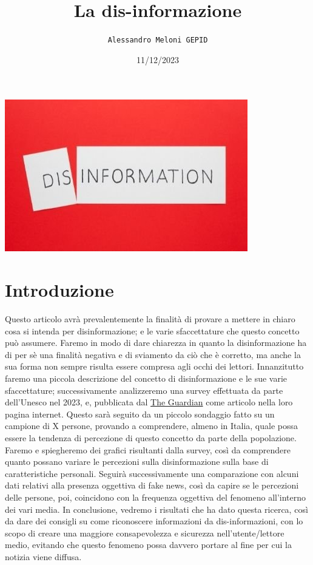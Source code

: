 \documentclass{article}
\title{\textbf{La dis-informazione}}
\author{\texttt{Alessandro Meloni GEPID}}
\date{11/12/2023}
\begin{document}
\maketitle
    \includegraphics[width = 0.6\linewidth]{Immagini/disinformation.jpeg}
\centering \tableofcontents
\newpage \section{Introduzione}
\flushleft
\begin{justify}
    Questo articolo avrà prevalentemente la finalità di provare a mettere in chiaro cosa si intenda per disinformazione; e le varie sfaccettature che questo concetto può assumere.
    Faremo in modo di dare chiarezza in quanto la disinformazione ha di per sè una finalità negativa e di sviamento da ciò che è corretto, ma anche la sua forma non sempre risulta essere compresa agli occhi dei lettori.
    Innanzitutto faremo una piccola descrizione del concetto di disinformazione e le sue varie sfaccettature; successivamente analizzeremo una survey effettuata da parte dell'Unesco nel 2023, e, pubblicata dal \href{https://www.theguardian.com/technology/2023/nov/07/85-of-people-worry-about-online-disinformation-global-survey-finds}{The Guardian} come articolo nella loro pagina internet. Questo sarà seguito da un piccolo sondaggio fatto su un campione di X persone, provando a comprendere, almeno in Italia, quale possa essere la tendenza di percezione di questo concetto da parte della popolazione.
    Faremo e spiegheremo dei grafici risultanti dalla survey, così da comprendere quanto possano variare le percezioni sulla disinformazione sulla base di caratteristiche personali. 
    Seguirà successivamente una comparazione con alcuni dati relativi alla presenza oggettiva di fake news, così da capire se le percezioni delle persone, poi, coincidono con la frequenza oggettiva del fenomeno all'interno dei vari media.
    In conclusione, vedremo i risultati che ha dato questa ricerca, così da dare dei consigli su come riconoscere informazioni da dis-informazioni, con lo scopo di creare una maggiore consapevolezza e sicurezza nell'utente/lettore medio, evitando che questo fenomeno possa davvero portare al fine per cui la notizia viene diffusa.
    
\end{justify}
\end{document}
